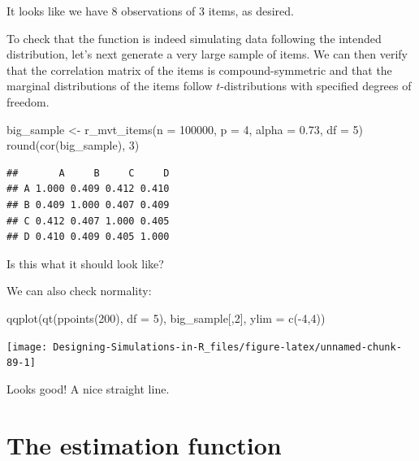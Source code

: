 \documentclass[
]{book}
\newenvironment{Shaded}{\begin{snugshade}}{\end{snugshade}}
\newcommand{\AttributeTok}[1]{\textcolor[rgb]{0.77,0.63,0.00}{#1}}
\newcommand{\DecValTok}[1]{\textcolor[rgb]{0.00,0.00,0.81}{#1}}
\newcommand{\FloatTok}[1]{\textcolor[rgb]{0.00,0.00,0.81}{#1}}
\newcommand{\FunctionTok}[1]{\textcolor[rgb]{0.00,0.00,0.00}{#1}}
\newcommand{\NormalTok}[1]{#1}
\newcommand{\OtherTok}[1]{\textcolor[rgb]{0.56,0.35,0.01}{#1}}
\newcommand{\SpecialCharTok}[1]{\textcolor[rgb]{0.00,0.00,0.00}{#1}}
\begin{document}
It looks like we have 8 observations of 3 items, as desired.

To check that the function is indeed simulating data following the intended distribution, let's next generate a very large sample of items. We can then verify that the correlation matrix of the items is compound-symmetric and that the marginal distributions of the items follow \(t\)-distributions with specified degrees of freedom.

\begin{Shaded}
\begin{Highlighting}[]
\NormalTok{big\_sample }\OtherTok{\textless{}{-}} \FunctionTok{r\_mvt\_items}\NormalTok{(}\AttributeTok{n =} \DecValTok{100000}\NormalTok{, }\AttributeTok{p =} \DecValTok{4}\NormalTok{, }\AttributeTok{alpha =} \FloatTok{0.73}\NormalTok{, }\AttributeTok{df =} \DecValTok{5}\NormalTok{)}
\FunctionTok{round}\NormalTok{(}\FunctionTok{cor}\NormalTok{(big\_sample), }\DecValTok{3}\NormalTok{)}
\end{Highlighting}
\end{Shaded}

\begin{verbatim}
##       A     B     C     D
## A 1.000 0.409 0.412 0.410
## B 0.409 1.000 0.407 0.409
## C 0.412 0.407 1.000 0.405
## D 0.410 0.409 0.405 1.000
\end{verbatim}

Is this what it should look like?

We can also check normality:

\begin{Shaded}
\begin{Highlighting}[]
\FunctionTok{qqplot}\NormalTok{(}\FunctionTok{qt}\NormalTok{(}\FunctionTok{ppoints}\NormalTok{(}\DecValTok{200}\NormalTok{), }\AttributeTok{df =} \DecValTok{5}\NormalTok{), big\_sample[,}\DecValTok{2}\NormalTok{], }\AttributeTok{ylim =} \FunctionTok{c}\NormalTok{(}\SpecialCharTok{{-}}\DecValTok{4}\NormalTok{,}\DecValTok{4}\NormalTok{))}
\end{Highlighting}
\end{Shaded}

\begin{center}\texttt{[image: Designing-Simulations-in-R\_files/figure-latex/unnamed-chunk-89-1]} \end{center}

Looks good! A nice straight line.

\hypertarget{the-estimation-function}{%
\section{The estimation function}\label{the-estimation-function}}
\end{document}
